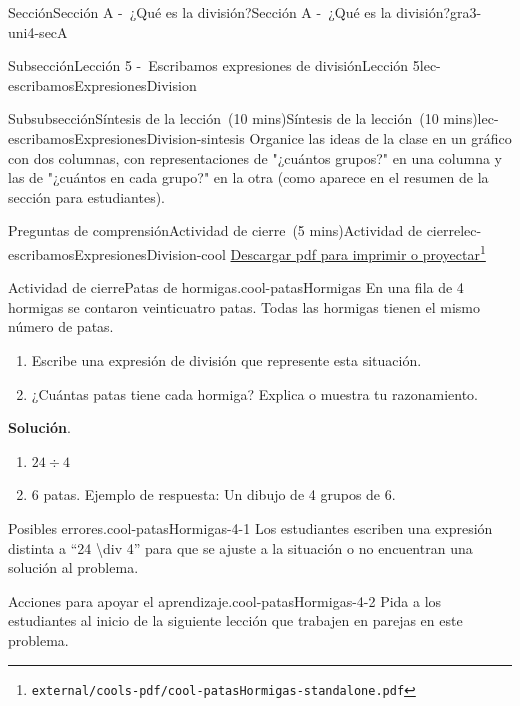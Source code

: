 \documentclass[oneside,10pt,]{article}
\newcommand{\blocktitlefont}{\relax}
\begin{document}
\begin{sectionptx}{Sección}{Sección A -~¿Qué es la división?}{}{Sección A -~¿Qué es la división?}{}{}{gra3-uni4-secA}
\begin{subsectionptx}{Subsección}{Lección 5 -~Escribamos expresiones de división}{}{Lección 5}{}{}{lec-escribamosExpresionesDivision}
\begin{subsubsectionptx}{Subsubsección}{Síntesis de la lección~(10 mins)}{}{Síntesis de la lección~(10 mins)}{}{}{lec-escribamosExpresionesDivision-sintesis}
Organice las ideas de la clase en un gráfico con dos columnas, con representaciones de "¿cuántos grupos?" en una columna y las de "¿cuántos en cada grupo?" en la otra (como aparece en el resumen de la sección para estudiantes).%
\end{subsubsectionptx}
%
%
\typeout{************************************************}
\typeout{************************************************}
%
\begin{reading-questions-subsubsection}{Preguntas de comprensión}{Actividad de cierre~(5 mins)}{}{Actividad de cierre}{}{}{lec-escribamosExpresionesDivision-cool}
\href{external/cools-pdf/cool-patasHormigas-standalone.pdf}{Descargar pdf para imprimir o proyectar}\footnote{\nolinkurl{external/cools-pdf/cool-patasHormigas-standalone.pdf}\label{lec-escribamosExpresionesDivision-cool-5}}\begin{project}{Actividad de cierre}{Patas de hormigas.}{cool-patasHormigas}%
En una fila de 4 hormigas se contaron veinticuatro patas. Todas las hormigas tienen el mismo número de patas.%
\par
%
\begin{enumerate}[label={(\alph*)}]
\item{}Escribe una expresión de división que represente esta situación.%
\item{}¿Cuántas patas tiene cada hormiga? Explica o muestra tu razonamiento.%
\end{enumerate}
%
\par\smallskip%
\noindent\textbf{\blocktitlefont Solución}.\hypertarget{cool-patasHormigas-3}{}\quad{}%
\begin{enumerate}[label={(\alph*)}]
\item{}\(\displaystyle 24\div 4\)%
\item{}6 patas. Ejemplo de respuesta: Un dibujo de 4 grupos de 6.%
\end{enumerate}
%
\end{project}%
\par
\begin{paragraphs}{Posibles errores.}{cool-patasHormigas-4-1}%
Los estudiantes escriben una expresión distinta a ``24 \textbackslash{}div 4'' para que se ajuste a la situación o no encuentran una solución al problema.%
\end{paragraphs}%
\begin{paragraphs}{Acciones para apoyar el aprendizaje.}{cool-patasHormigas-4-2}%
Pida a los estudiantes al inicio de la siguiente lección que trabajen en parejas en este problema.%

\end{paragraphs}
\end{reading-questions-subsubsection}
\end{subsectionptx}
\end{sectionptx}
\end{document}
